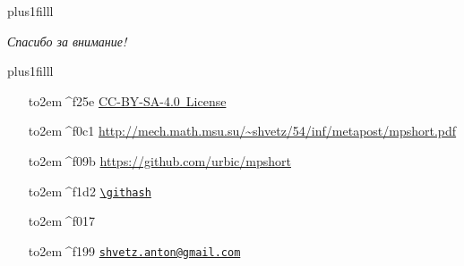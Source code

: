 \begin{frame}

\vskip0pt plus1filll

{\Huge\itshape
Спасибо за внимание!}

\vskip0pt plus1filll

\begin{itemize}
\tiny
\item[\hbox to2em{\hfil{\fontspec{FontAwesome}^^^^f25e}\hfil}]
\href{https://creativecommons.org/licenses/by-sa/4.0/deed.ru}
{{CC-BY-SA-4.0 License}}
\item[\hbox to2em{\hfil{\fontspec{FontAwesome}^^^^f0c1}\hfil}]
\url{http://mech.math.msu.su/~shvetz/54/inf/metapost/mpshort.pdf}
\item[\hbox to2em{\hfil{\fontspec{FontAwesome}^^^^f09b}\hfil}]
\url{https://github.com/urbic/mpshort}
\item[\hbox to2em{\hfil{\fontspec{FontAwesome}^^^^f1d2}\hfil}]
\expandafter\href{https://github.com/urbic/mpshort/commit/\githash}{\nolinkurl{\githash}}
\item[\hbox to2em{\hfil{\fontspec{FontAwesome}^^^^f017}\hfil}]
{\gittime}
\item[\hbox to2em{\hfil{\fontspec{FontAwesome}^^^^f199}\hfil}]
\href{mailto:shvetz.anton@gmail.com?subject=mpshort}{\nolinkurl{shvetz.anton@gmail.com}}
\end{itemize}
\vspace{3ex}
\end{frame}
